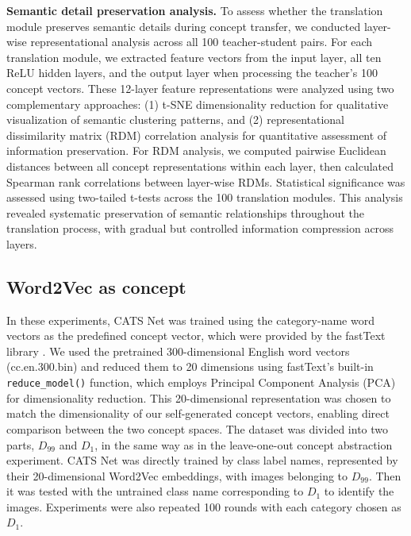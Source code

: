 \documentclass[pdflatex,sn-mathphys-num,lineno]{sn-jnl}%
\begin{document}
\begin{CJK}{UTF8}{gbsn}
\textbf{Semantic detail preservation analysis.} To assess whether the translation module preserves semantic details during concept transfer, we conducted layer-wise representational analysis across all 100 teacher-student pairs. For each translation module, we extracted feature vectors from the input layer, all ten ReLU hidden layers, and the output layer when processing the teacher's 100 concept vectors. These 12-layer feature representations were analyzed using two complementary approaches: (1) t-SNE dimensionality reduction for qualitative visualization of semantic clustering patterns, and (2) representational dissimilarity matrix (RDM) correlation analysis for quantitative assessment of information preservation. For RDM analysis, we computed pairwise Euclidean distances between all concept representations within each layer, then calculated Spearman rank correlations between layer-wise RDMs. Statistical significance was assessed using two-tailed t-tests across the 100 translation modules. This analysis revealed systematic preservation of semantic relationships throughout the translation process, with gradual but controlled information compression across layers.

\subsection{Word2Vec as concept}
In these experiments, CATS Net was trained using the category-name word vectors as the predefined concept vector, which were provided by the fastText library \cite{mikolov_advances_2018}. We used the pretrained 300-dimensional English word vectors (cc.en.300.bin) and reduced them to 20 dimensions using fastText's built-in \texttt{reduce\_model()} function, which employs Principal Component Analysis (PCA) for dimensionality reduction. This 20-dimensional representation was chosen to match the dimensionality of our self-generated concept vectors, enabling direct comparison between the two concept spaces. The dataset was divided into two parts, $D_{99}$ and $D_1$, in the same way as in the leave-one-out concept abstraction experiment. CATS Net was directly trained by class label names, represented by their 20-dimensional Word2Vec embeddings, with images belonging to $D_{99}$. Then it was tested with the untrained class name corresponding to $D_1$ to identify the images. Experiments were also repeated 100 rounds with each category chosen as $D_1$.


\end{CJK}
\end{document}
